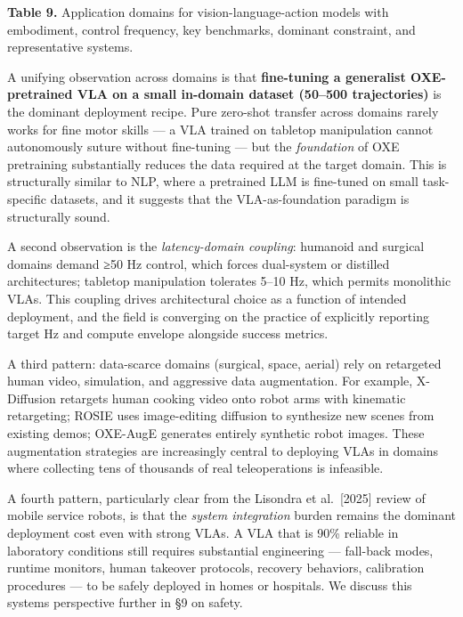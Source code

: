 \documentclass{article}
\begin{document}
\textbf{Table 9.} Application domains for vision-language-action models with embodiment, control frequency, key benchmarks, dominant constraint, and representative systems.

A unifying observation across domains is that \textbf{fine-tuning a generalist OXE-pretrained VLA on a small in-domain dataset (50--500 trajectories)} is the dominant deployment recipe. Pure zero-shot transfer across domains rarely works for fine motor skills --- a VLA trained on tabletop manipulation cannot autonomously suture without fine-tuning --- but the \emph{foundation} of OXE pretraining substantially reduces the data required at the target domain. This is structurally similar to NLP, where a pretrained LLM is fine-tuned on small task-specific datasets, and it suggests that the VLA-as-foundation paradigm is structurally sound.

A second observation is the \emph{latency-domain coupling}: humanoid and surgical domains demand ≥50 Hz control, which forces dual-system or distilled architectures; tabletop manipulation tolerates 5--10 Hz, which permits monolithic VLAs. This coupling drives architectural choice as a function of intended deployment, and the field is converging on the practice of explicitly reporting target Hz and compute envelope alongside success metrics.

A third pattern: data-scarce domains (surgical, space, aerial) rely on retargeted human video, simulation, and aggressive data augmentation. For example, X-Diffusion \cite{pace2025xdiffusiontraining} retargets human cooking video onto robot arms with kinematic retargeting; ROSIE \cite{yu2023scalingrobotlearni} uses image-editing diffusion to synthesize new scenes from existing demos; OXE-AugE \cite{ji2025oxeaugealargescale} generates entirely synthetic robot images. These augmentation strategies are increasingly central to deploying VLAs in domains where collecting tens of thousands of real teleoperations is infeasible.

A fourth pattern, particularly clear from the Lisondra et al.~{[}2025{]} review of mobile service robots, is that the \emph{system integration} burden remains the dominant deployment cost even with strong VLAs. A VLA that is 90\% reliable in laboratory conditions still requires substantial engineering --- fall-back modes, runtime monitors, human takeover protocols, recovery behaviors, calibration procedures --- to be safely deployed in homes or hospitals. We discuss this systems perspective further in §9 on safety.
\end{document}
